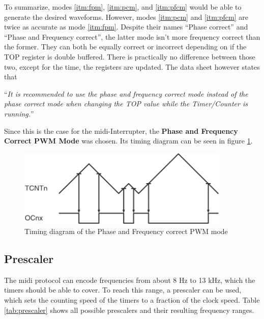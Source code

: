 To summarize, modes \ref{itm:fpm}, \ref{itm:pcm}, and \ref{itm:pfcm} would be able to generate the desired waveforms. However, modes \ref{itm:pcm} and \ref{itm:pfcm} are twice as accurate as mode \ref{itm:fpm}. Despite their names \enquote{Phase correct} and \enquote{Phase and Frequency correct}, the latter mode isn't more frequency correct than the former. They can both be equally correct or incorrect depending on if the TOP register is double buffered. There is practically no difference between those two, except for the time, the registers are updated. The data sheet however states that

\begin{displayquote}
\enquote{\emph{It is recommended to use the phase and frequency correct mode instead of the phase correct mode when changing the TOP value while the Timer/Counter is running.}}
\end{displayquote}

Since this is the case for the \gls{midi}-Interrupter, the \textbf{Phase and Frequency Correct PWM Mode} was chosen. Its timing diagram can be seen in figure \ref{fig:timer_diagram}.

\begin{figure}[h!]
    \centering
    \includegraphics[width=0.9\textwidth]{felix/resources/timer_diagram.png}
    \caption{Timing diagram of the Phase and Frequency correct PWM mode}
    \label{fig:timer_diagram}
\end{figure}

\subsection{Prescaler}

The \gls{midi} protocol can encode frequencies from about 8 Hz to 13 kHz, which the timers should be able to cover. To reach this range, a prescaler can be used, which sets the counting speed of the timers to a fraction of the clock speed. Table \ref{tab:prescaler} shows all possible prescalers and their resulting frequency ranges.

